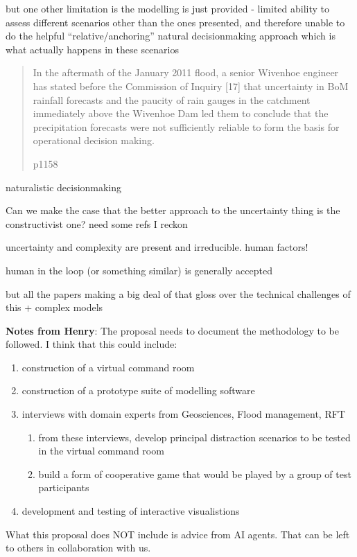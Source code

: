\documentclass[a4paper,fontsize=12pt]{scrartcl}
\begin{document}
but one other limitation is the modelling is just provided - limited
ability to assess different scenarios other than the ones presented,
and therefore unable to do the helpful ``relative/anchoring'' natural
decisionmaking approach which is what actually happens in these
scenarios

\blockquote[\parencite{vandenhonert_2011_2011} p1158]{In the aftermath of
  the January 2011 flood, a senior Wivenhoe engineer has stated before
  the Commission of Inquiry [17] that uncertainty in BoM rainfall
  forecasts and the paucity of rain gauges in the catchment
  immediately above the Wivenhoe Dam led them to conclude that the
  precipitation forecasts were not sufficiently reliable to form the
  basis for operational decision making.}

naturalistic decisionmaking\parencite{lipshitz_taking_2001}

Can we make the case that the better approach to the uncertainty thing
is the constructivist one? need some refs I reckon


uncertainty and complexity are present and irreducible. human factors!

human in the loop (or something similar) is generally accepted

but all the papers making a big deal of that gloss over the technical
challenges of this + complex models

\textbf{Notes from Henry}:
The proposal needs to document the methodology to be followed. I think
that this could include:

\begin{enumerate}
\item construction of a virtual command room
\item construction of a prototype suite of modelling software
\item interviews with domain experts from Geosciences, Flood
  management, RFT
  \begin{enumerate}
  \item from these interviews, develop principal distraction scenarios
    to be tested in the virtual command room
  \item build a form of cooperative game that would be played by a
    group of test participants
  \end{enumerate}
\item development and testing of interactive visualistions
\end{enumerate}

What this proposal does NOT include is advice from AI agents. That can
be left to others in collaboration with us.
\end{document}
